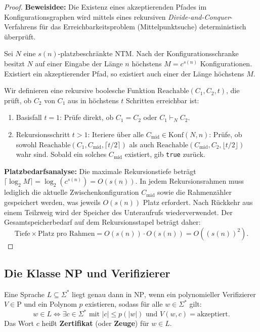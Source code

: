 \begin{proof}
    \textbf{Beweisidee:} Die Existenz eines akzeptierenden Pfades im Konfigurationsgraphen wird mittels eines rekursiven \emph{Divide-and-Conquer}-Verfahrens für das Erreichbarkeitsproblem (Mittelpunktsuche) deterministisch überprüft.
    
    Sei $N$ eine $s(n)$-platzbeschränkte NTM. Nach der Konfigurationsschranke besitzt $N$ auf einer Eingabe der Länge $n$ höchstens $M = c^{s(n)}$ Konfigurationen. Existiert ein akzeptierender Pfad, so existiert auch einer der Länge höchstens $M$.
    
    Wir definieren eine rekursive boolesche Funktion $\mathrm{Reachable}(C_1, C_2, t)$, die prüft, ob $C_2$ von $C_1$ aus in höchstens $t$ Schritten erreichbar ist:
    \begin{enumerate}
        \item Basisfall $t = 1$: Prüfe direkt, ob $C_1 = C_2$ oder $C_1 \vdash_N C_2$.
        \item Rekursionsschritt $t > 1$: Iteriere über alle $C_{\mathrm{mid}} \in \mathrm{Konf}(N, n)$:
        Prüfe, ob sowohl $\mathrm{Reachable}(C_1, C_{\mathrm{mid}}, \lceil t/2 \rceil)$
        als auch $\mathrm{Reachable}(C_{\mathrm{mid}}, C_2, \lfloor t/2 \rfloor)$ wahr sind. Sobald ein solches $C_{\mathrm{mid}}$ existiert, gib \texttt{true} zurück.
    \end{enumerate}
    \textbf{Platzbedarfsanalyse:} Die maximale Rekursionstiefe beträgt $\lceil\log_2 M\rceil = \log_2(c^{s(n)}) = O(s(n))$. In jedem Rekursionsrahmen muss lediglich die aktuelle Zwischenkonfiguration $C_{\mathrm{mid}}$ sowie die Rahmenzähler gespeichert werden, was jeweils $O(s(n))$ Platz erfordert. Nach Rückkehr aus einem Teilzweig wird der Speicher des Unteraufrufs wiederverwendet. Der Gesamtspeicherbedarf auf dem Rekursionsstapel beträgt daher:
    \[
        \text{Tiefe} \times \text{Platz pro Rahmen} = O(s(n)) \cdot O(s(n)) = O((s(n))^2).
    \]
\end{proof}

\subsection{Die Klasse NP und Verifizierer}

\begin{theorem}
    Eine Sprache $L \subseteq \Sigma^*$ liegt genau dann in $\mathrm{NP}$, wenn ein polynomieller Verifizierer $V \in \mathrm{P}$ und ein Polynom $p$ existieren, sodass für alle $w \in \Sigma^*$ gilt:
    \[
        w \in L \iff \exists c \in \Sigma^* \text{ mit } |c| \le p(|w|) \text{ und } V(w, c) = \text{akzeptiert}.
    \]
    Das Wort $c$ heißt \textbf{Zertifikat} (oder \textbf{Zeuge}) für $w \in L$.
\end{theorem}

